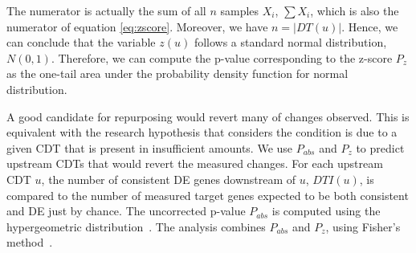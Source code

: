 The numerator is actually the sum of all $n$ samples $X_i$, $\sum{X_i}$, which is also the numerator of equation \ref{eq:zscore}. 
Moreover, we have $n = |DT(u)|$.
Hence, we can conclude that the variable $z(u)$ follows a standard normal distribution, $N(0,1)$. Therefore, we can compute the p-value corresponding to the z-score $P_z$ as the one-tail area under the probability density function for normal distribution.

A good candidate for repurposing would revert many of changes observed. This is equivalent  with the research hypothesis that considers the condition is due to a given CDT that is present in insufficient amounts.
We use $P_{abs}$ and $P_z$ to predict upstream CDTs that would revert the measured changes. 
For each upstream CDT $u$, the number of consistent DE genes downstream of $u$, $DTI(u)$, is compared to the number of measured target genes expected to be both consistent and DE just by chance. The uncorrected p-value $P_{abs}$ is computed using the hypergeometric distribution~\cite{DraghiciOT:2003, DraghiciBook:2011}. The analysis combines $P_{abs}$ and $P_z$, using  Fisher's method~\cite{fisher1925statistical}. 

